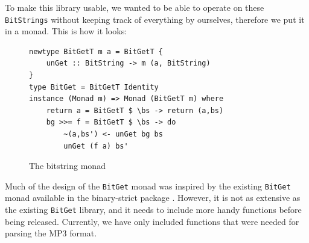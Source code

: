 \documentclass[a4paper,12pt]{article}
\begin{document}
        To make this library usable, we wanted to be able to operate on these
        \texttt{BitStrings} without keeping track of everything by ourselves,
        therefore we put it in a monad. This is how it looks:

\begin{figure}[h]
  \begin{center}
        \begin{lstlisting}
newtype BitGetT m a = BitGetT {
    unGet :: BitString -> m (a, BitString)
}
type BitGet = BitGetT Identity
instance (Monad m) => Monad (BitGetT m) where
    return a = BitGetT $ \bs -> return (a,bs)
    bg >>= f = BitGetT $ \bs -> do
        ~(a,bs') <- unGet bg bs
        unGet (f a) bs'
    \end{lstlisting}
    \caption{The bitstring monad}\label{fig:bitstringmonad}
  \end{center}
\end{figure}

    Much of the design of the \texttt{BitGet} monad was inspired by the existing
    \texttt{BitGet} monad available in the binary-strict package
    \cite{binarystrict}. However, it is not as extensive as the existing
    \texttt{BitGet} library, and it needs to include more handy functions before
    being released. Currently, we have only included functions that were needed
    for parsing the MP3 format.
\end{document}
